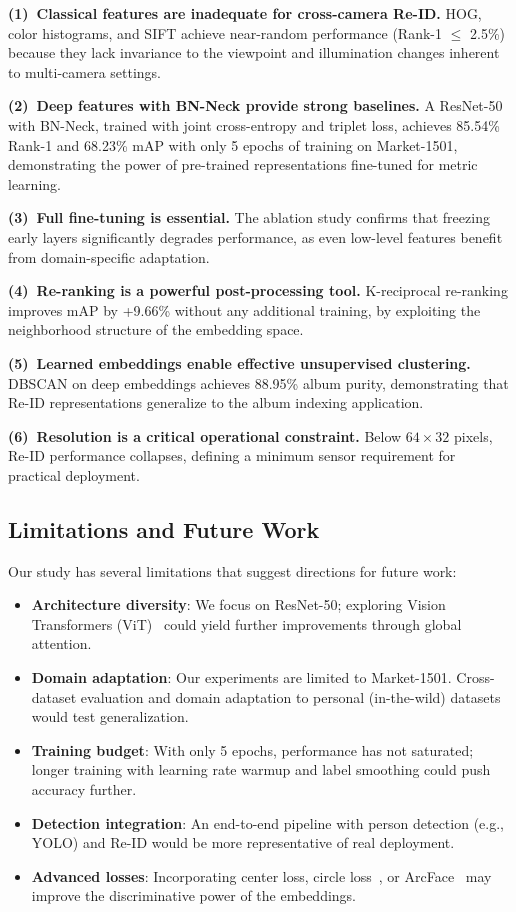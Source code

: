 \documentclass[final]{cvpr}
\begin{document}
\textbf{(1)~Classical features are inadequate for cross-camera Re-ID.}
HOG, color histograms, and SIFT achieve near-random performance (Rank-1 $\leq$ 2.5\%) because they lack invariance to the viewpoint and illumination changes inherent to multi-camera settings.

\textbf{(2)~Deep features with BN-Neck provide strong baselines.}
A ResNet-50 with BN-Neck, trained with joint cross-entropy and triplet loss, achieves 85.54\% Rank-1 and 68.23\% mAP with only 5 epochs of training on Market-1501, demonstrating the power of pre-trained representations fine-tuned for metric learning.

\textbf{(3)~Full fine-tuning is essential.}
The ablation study confirms that freezing early layers significantly degrades performance, as even low-level features benefit from domain-specific adaptation.

\textbf{(4)~Re-ranking is a powerful post-processing tool.}
K-reciprocal re-ranking improves mAP by +9.66\% without any additional training, by exploiting the neighborhood structure of the embedding space.

\textbf{(5)~Learned embeddings enable effective unsupervised clustering.}
DBSCAN on deep embeddings achieves 88.95\% album purity, demonstrating that Re-ID representations generalize to the album indexing application.

\textbf{(6)~Resolution is a critical operational constraint.}
Below $64 \times 32$ pixels, Re-ID performance collapses, defining a minimum sensor requirement for practical deployment.

\subsection{Limitations and Future Work}
Our study has several limitations that suggest directions for future work:
\begin{itemize}
    \item \textbf{Architecture diversity}: We focus on ResNet-50; exploring Vision Transformers (ViT)~\cite{he2021transreid} could yield further improvements through global attention.
    \item \textbf{Domain adaptation}: Our experiments are limited to Market-1501. Cross-dataset evaluation and domain adaptation to personal (in-the-wild) datasets would test generalization.
    \item \textbf{Training budget}: With only 5 epochs, performance has not saturated; longer training with learning rate warmup and label smoothing could push accuracy further.
    \item \textbf{Detection integration}: An end-to-end pipeline with person detection (e.g., YOLO) and Re-ID would be more representative of real deployment.
    \item \textbf{Advanced losses}: Incorporating center loss, circle loss~\cite{sun2020circle}, or ArcFace~\cite{deng2019arcface} may improve the discriminative power of the embeddings.
\end{itemize}

{\small


}
\end{document}
